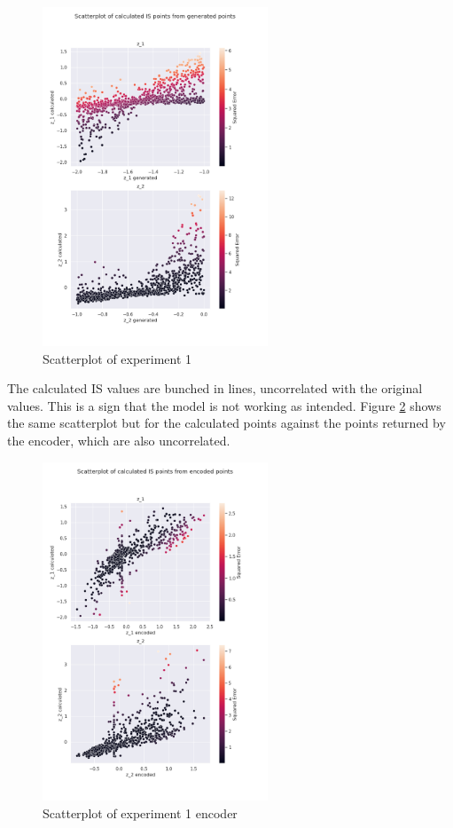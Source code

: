 \begin{figure}[H]
    \centering
    \includegraphics[width=0.6\textwidth]{Cap5/scatterplot1}
    \caption{Scatterplot of experiment 1}
    \label{fig:scatter_exp1}
\end{figure}

The calculated IS values are bunched in lines, uncorrelated with the original values. This is a sign that the model is not working as intended. Figure \ref{fig:scatter_enc_exp1} shows the same scatterplot but for the calculated points against the points returned by the encoder, which are also uncorrelated.

\begin{figure}[H]
    \centering
    \includegraphics[width=0.6\textwidth]{Cap5/scatterplot_enc1}
    \caption{Scatterplot of experiment 1 encoder}
    \label{fig:scatter_enc_exp1}
\end{figure}

